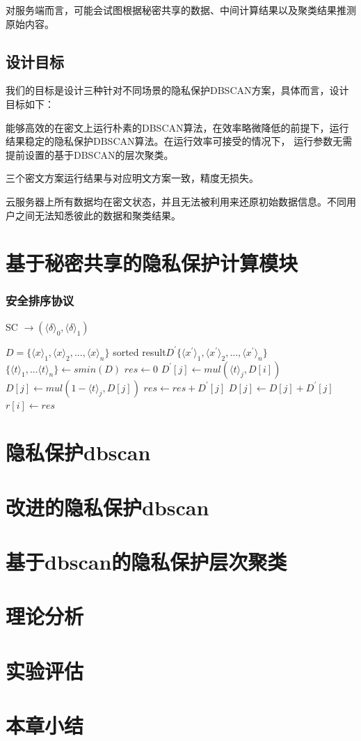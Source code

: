 对服务端而言，可能会试图根据秘密共享的数据、中间计算结果以及聚类结果推测原始内容。
\subsection{设计目标}
我们的目标是设计三种针对不同场景的隐私保护DBSCAN方案，具体而言，设计目标如下：

\begin{compactitem}
	\item 能够高效的在密文上运行朴素的DBSCAN算法，在效率略微降低的前提下，运行结果稳定的隐私保护DBSCAN算法。在运行效率可接受的情况下， 运行参数无需提前设置的基于DBSCAN的层次聚类。
	\item 三个密文方案运行结果与对应明文方案一致，精度无损失。
	\item 云服务器上所有数据均在密文状态，并且无法被利用来还原初始数据信息。不同用户之间无法知悉彼此的数据和聚类结果。
\end{compactitem}
\section{基于秘密共享的隐私保护计算模块}
\label{s4-subpro}
\subsubsection{安全排序协议}
\begin{algorithm}[htbp]
	\renewcommand{\algorithmicrequire}{\textbf{输入:}}
	\renewcommand{\algorithmicensure}{\textbf{输出:}}
	\caption{SC $\rightarrow (\langle \delta \rangle_0, \langle \delta \rangle_1)$}
	\label{alg_sort}
	\begin{algorithmic}[1]
		\REQUIRE $ D = \{\langle x\rangle_1, \langle x\rangle_2,...,\langle x\rangle_n\} $
		\ENSURE sorted result$ D^{\prime}\{\langle x^{\prime}\rangle_1, \langle x^{\prime}\rangle_2,...,\langle x^{\prime}\rangle_n\} $
		\STATE $ \{\langle t\rangle_1,...\langle t \rangle_n\} \leftarrow smin(D)$
		\STATE $ res \leftarrow 0 $
		\STATE $ D^{\prime}[j] \leftarrow  mul(\langle t \rangle_j, D[i])$
		\STATE $ D[j] \leftarrow mul(1-\langle t \rangle_j, D[j]) $
		\STATE $ res \leftarrow res + D^{\prime}[j] $
		\STATE $ D[j] \leftarrow D[j] + D^{\prime}[j] $
		\ENDFOR
		\STATE $ r[i] \leftarrow res $
		\ENDFOR
	\end{algorithmic}
\end{algorithm}
\section{隐私保护dbscan}
\label{s4-t1}
\section{改进的隐私保护dbscan}
\label{s4-t2}
\section{基于dbscan的隐私保护层次聚类}
\label{s4-t3}
\section{理论分析}
\label{s4-lilun}
\section{实验评估}
\label{s4-shiyan}
\section{本章小结}
\label{s4-xiaojie}